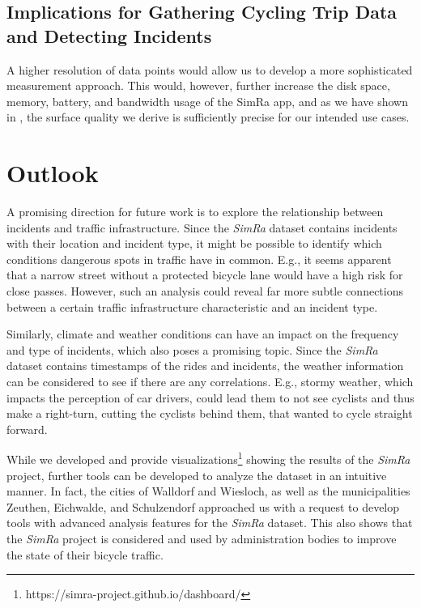 \subsection*{Implications for Gathering Cycling Trip Data and Detecting Incidents}
A higher resolution of data points would allow us to develop a more sophisticated measurement approach.
This would, however, further increase the disk space, memory, battery, and bandwidth usage of the SimRa app, and as we have shown in , the surface quality we derive is sufficiently precise for our intended use cases.

\section{Outlook}
\label{sec:outlook}
A promising direction for future work is to explore the relationship between incidents and traffic infrastructure.
Since the \textit{SimRa} dataset contains incidents with their location and incident type, it might be possible to identify which conditions dangerous spots in traffic have in common.
E.g., it seems apparent that a narrow street without a protected bicycle lane would have a high risk for close passes.
However, such an analysis could reveal far more subtle connections between a certain traffic infrastructure characteristic and an incident type.

Similarly, climate and weather conditions can have an impact on the frequency and type of incidents, which also poses a promising topic.
Since the \textit{SimRa} dataset contains timestamps of the rides and incidents, the weather information can be considered to see if there are any correlations.
E.g., stormy weather, which impacts the perception of car drivers, could lead them to not see cyclists and thus make a right-turn, cutting the cyclists behind them, that wanted to cycle straight forward.

While we developed and provide visualizations\footnote{https://simra-project.github.io/dashboard/} showing the results of the \textit{SimRa} project, further tools can be developed to analyze the dataset in an intuitive manner.
In fact, the cities of Walldorf and Wiesloch, as well as the municipalities Zeuthen, Eichwalde, and Schulzendorf approached us with a request to develop tools with advanced analysis features for the \textit{SimRa} dataset.
This also shows that the \textit{SimRa} project is considered and used by administration bodies to improve the state of their bicycle traffic.
 